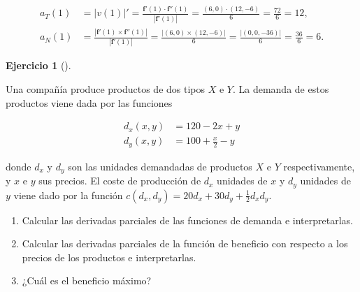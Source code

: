 \documentclass[
  a4paper,
]{scrreport}
\theoremstyle{definition}
\newtheorem{exercise}{Ejercicio}[chapter]
\theoremstyle{remark}
\begin{document}
\begin{tcolorbox}
\begin{enumerate}
  \begin{align*}
  a_T(1) 
  &= |v(1)|'
  = \frac{\mathbf{f}'(1) \cdot \mathbf{f}''(1)}{|\mathbf{f}'(1)|} 
  = \frac{(6, 0) \cdot (12, -6)}{6}
  = \frac{72}{6}
  = 12, \\
  a_N(1)
  &= \frac{|\mathbf{f}'(1) \times \mathbf{f}''(1)|}{|\mathbf{f}'(1)|}
  = \frac{|(6, 0) \times (12, -6)|}{6}
  = \frac{|(0, 0, -36)|}{6}
  = \frac{36}{6}
  = 6.
  \end{align*}
\end{enumerate}

\end{tcolorbox}

\begin{exercise}[]\protect\hypertarget{exr-2}{}\label{exr-2}

Una compañía produce productos de dos tipos \(X\) e \(Y\). La demanda de
estos productos viene dada por las funciones

\begin{align*}
d_x(x,y) &= 120 - 2x + y\\
d_y(x,y) &= 100 + \frac{x}{2} - y
\end{align*}

donde \(d_x\) y \(d_y\) son las unidades demandadas de productos \(X\) e
\(Y\) respectivamente, y \(x\) e \(y\) sus precios. El coste de
producción de \(d_x\) unidades de \(x\) y \(d_y\) unidades de \(y\)
viene dado por la función
\(c(d_x,d_y) = 20 d_x + 30 d_y + \frac{1}{2}d_xd_y\).

\begin{enumerate}
\def\labelenumi{\alph{enumi}.}
\item
  Calcular las derivadas parciales de las funciones de demanda e
  interpretarlas.
\item
  Calcular las derivadas parciales de la función de beneficio con
  respecto a los precios de los productos e interpretarlas.
\item
  ¿Cuál es el beneficio máximo?
\end{enumerate}

\end{exercise}
\end{document}
